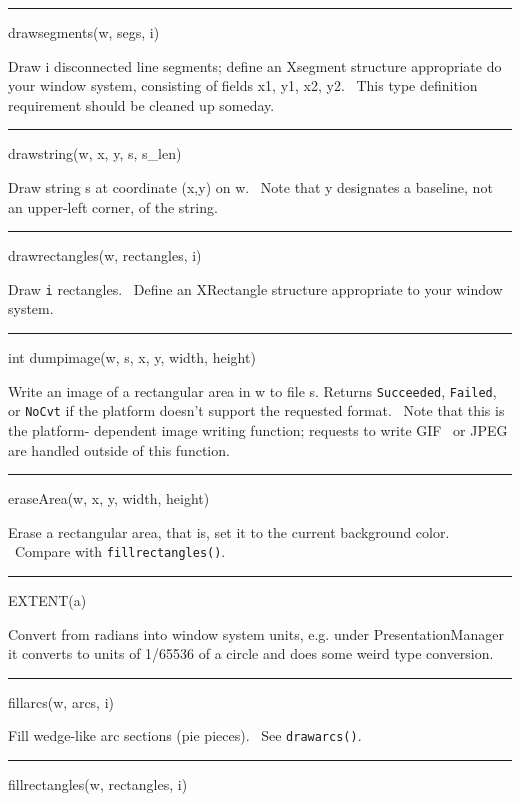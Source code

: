 \bigskip\hrule\vspace{0.1cm}
\noindent
drawsegments(w, segs, i)


Draw i disconnected line segments; define an Xsegment structure appropriate do your window system, consisting of fields
x1, y1, x2, y2. \ This type definition requirement should be cleaned up someday.


\bigskip\hrule\vspace{0.1cm}
\noindent
drawstring(w, x, y, s, s\_len)


Draw string s at coordinate (x,y) on w. \ Note that y designates a baseline, not an upper-left corner, of the string.


\bigskip\hrule\vspace{0.1cm}
\noindent
drawrectangles(w, rectangles, i)


Draw \texttt{i} rectangles. \ Define an XRectangle structure appropriate to your window system.

\bigskip\hrule\vspace{0.1cm}
\noindent



int dumpimage(w, s, x, y, width, height)


Write an image of a rectangular area in w to file s. Returns \texttt{Succeeded}, \texttt{Failed}, or \texttt{NoCvt} if
the platform doesn't support the requested format. \ Note that this is the {\textquotedbl}platform- dependent image
writing function{\textquotedbl}; requests to write GIF \ or JPEG are handled outside of this function.


\bigskip\hrule\vspace{0.1cm}
\noindent
eraseArea(w, x, y, width, height)


Erase a rectangular area, that is, set it to the current background color. \ Compare with \texttt{fillrectangles()}.


\bigskip\hrule\vspace{0.1cm}
\noindent
EXTENT(a)


Convert from radians into window system units, e.g. under PresentationManager it converts to units of 1/65536 of a
circle and does some weird type conversion.


\bigskip\hrule\vspace{0.1cm}
\noindent
fillarcs(w, arcs, i)


Fill wedge-like arc sections (pie pieces). \ See \texttt{drawarcs()}.


\bigskip\hrule\vspace{0.1cm}
\noindent
fillrectangles(w, rectangles, i)


